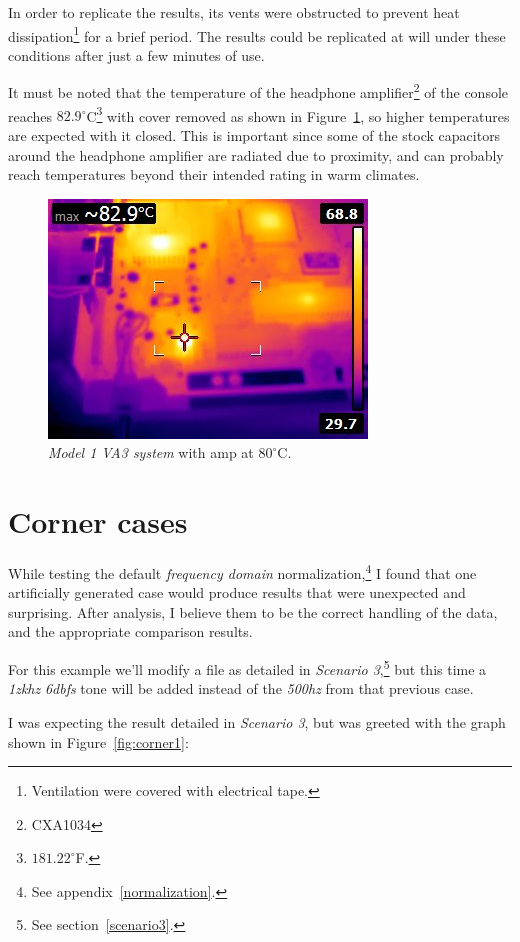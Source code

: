 \documentclass[10pt,a4paper]{report}
\newcommand{\hz}[1]{\textit{\mbox{#1\acrshort{hz}}}}
\newcommand{\khz}[1]{\textit{\mbox{#1\acrshort{khz}}}}
\newcommand{\db}[1]{\textit{\mbox{#1\acrshort{dbfs}}}}
\begin{document}
\begin{appendices}
In order to replicate the results, its vents were obstructed to prevent heat dissipation\footnote{Ventilation were covered with electrical tape.} for a brief period. The results could be replicated at will under these conditions after just a few minutes of use.

It must be noted that the temperature of the headphone amplifier\footnote{CXA1034} of the console reaches $82.9^\circ$C\footnote{$181.22^\circ$F.} with cover removed as shown in Figure~\ref{fig:heathigh}, so higher temperatures are expected with it closed. This is important since some of the stock capacitors around the headphone amplifier are radiated due to proximity, and can probably reach temperatures beyond their intended rating in warm climates.

\begin{figure}[H]
	\centering
	\includegraphics[width=0.4\linewidth]{images/heat/2-hot.jpg}
	\caption[Hot Console]{\textit{Model 1 VA3 system} with amp at $80^\circ$C.}
	\label{fig:heathigh}
\end{figure}

\chapter{Corner cases}
\label{cornercase}

While testing the default\textit{ frequency domain} normalization,\footnote{See appendix~\ref{normalization}.} I found that one artificially generated case would produce results that were unexpected and surprising. After analysis, I believe them to be the correct handling of the data, and the appropriate comparison results.

For this example we'll modify a file as detailed in \textit{Scenario 3},\footnote{See section~\ref{scenario3}.} but this time a \khz{1z} \db{6} tone will be added instead of the \hz{500} from that previous case.

I was expecting the result detailed in \textit{Scenario 3}, but was greeted with the graph shown in Figure~\ref{fig:corner1}:


\end{appendices}
\end{document}
